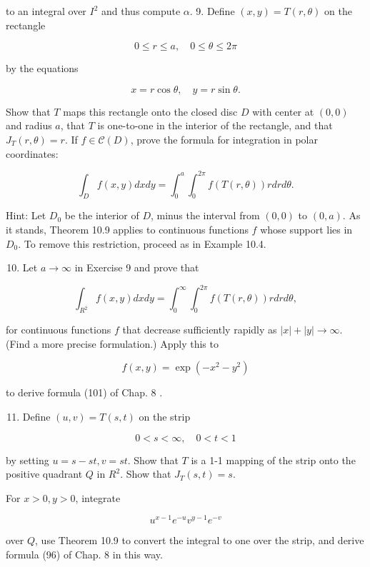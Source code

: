 \documentclass[10pt]{article}
\begin{document}
to an integral over $I^{2}$ and thus compute $\alpha$. 9. Define $(x, y)=T(r, \theta)$ on the rectangle

$$
0 \leq r \leq a, \quad 0 \leq \theta \leq 2 \pi
$$

by the equations

$$
x=r \cos \theta, \quad y=r \sin \theta .
$$

Show that $T$ maps this rectangle onto the closed disc $D$ with center at $(0,0)$ and radius $a$, that $T$ is one-to-one in the interior of the rectangle, and that $J_{T}(r, \theta)=r$. If $f \in \mathscr{C}(D)$, prove the formula for integration in polar coordinates:

$$
\int_{D} f(x, y) d x d y=\int_{0}^{a} \int_{0}^{2 \pi} f(T(r, \theta)) r d r d \theta .
$$

Hint: Let $D_{0}$ be the interior of $D$, minus the interval from $(0,0)$ to $(0, a)$. As it stands, Theorem 10.9 applies to continuous functions $f$ whose support lies in $D_{0}$. To remove this restriction, proceed as in Example 10.4.

\begin{enumerate}
  \setcounter{enumi}{9}
  \item Let $a \rightarrow \infty$ in Exercise 9 and prove that
\end{enumerate}

$$
\int_{R^{2}} f(x, y) d x d y=\int_{0}^{\infty} \int_{0}^{2 \pi} f(T(r, \theta)) r d r d \theta,
$$

for continuous functions $f$ that decrease sufficiently rapidly as $|x|+|y| \rightarrow \infty$. (Find a more precise formulation.) Apply this to

$$
f(x, y)=\exp \left(-x^{2}-y^{2}\right)
$$

to derive formula (101) of Chap. 8 .

\begin{enumerate}
  \setcounter{enumi}{10}
  \item Define $(u, v)=T(s, t)$ on the strip
\end{enumerate}

$$
0<s<\infty, \quad 0<t<1
$$

by setting $u=s-s t, v=s t$. Show that $T$ is a 1-1 mapping of the strip onto the positive quadrant $Q$ in $R^{2}$. Show that $J_{T}(s, t)=s$.

For $x>0, y>0$, integrate

$$
u^{x-1} e^{-u} v^{y-1} e^{-v}
$$

over $Q$, use Theorem 10.9 to convert the integral to one over the strip, and derive formula (96) of Chap. 8 in this way.
\end{document}
